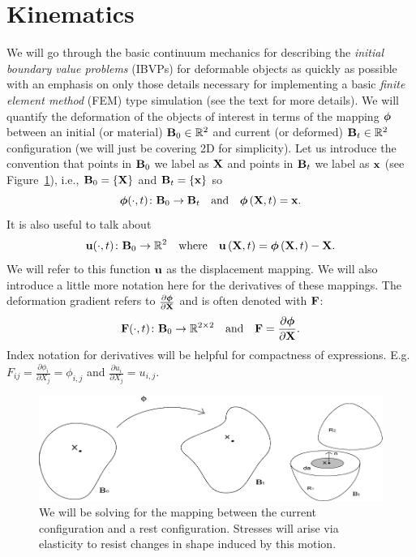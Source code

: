 
\section{Kinematics}

We will go through the basic continuum mechanics for describing the \emph{initial boundary value problems} (IBVPs) for deformable objects as quickly as possible with an emphasis on only those details necessary for implementing a basic \emph{finite element method} (FEM) type simulation (see the text \cite{Bonet_Wood_2008} for more details). We will quantify the deformation of the objects of interest in terms of the mapping $\boldsymbol{\phi}$ between an initial (or material) $\mathbf{B}_0 \in \mathbb{R}^2$ and current (or deformed) $\mathbf{B}_t \in \mathbb{R}^2$ configuration (we will just be covering 2D for simplicity). Let us introduce the convention that points in $\mathbf{B}_0$ we label as $\mathbf{X}$ and points in $\mathbf{B}_t$ we label as $\mathbf{x}$ (see Figure~\ref{fig:phi}), i.e., $\mathbf{B}_0 = \left\{ \mathbf{X} \right\}$ and $\mathbf{B}_t = \left\{ \mathbf{x} \right\}$ so
\begin{equation*}
\boldsymbol{\phi}(\cdot,t) \colon \mathbf{B}_0 \to \mathbf{B}_t \quad \text{and} \quad \boldsymbol{\phi} \left( \mathbf{X}, t \right) = \mathbf{x}.
\end{equation*}
It is also useful to talk about
\begin{equation*}
\mathbf{u}(\cdot,t) \colon \mathbf{B}_0 \to \mathbb{R}^2 \quad \text{where} \quad \mathbf{u} \left( \mathbf{X}, t \right) = \boldsymbol{\phi} \left( \mathbf{X}, t \right) - \mathbf{X}.
\end{equation*}
We will refer to this function $\mathbf{u}$ as the displacement mapping. We will also introduce a little more notation here for the derivatives of these mappings. The deformation gradient refers to $\frac{\partial\boldsymbol{\phi}}{\partial\mathbf{X}}$ and is often denoted with $\mathbf{F}$:
\begin{equation*}
\mathbf{F}(\cdot,t) \colon \mathbf{B}_0 \to \mathbb{R}^{2\times2} \quad \text{and} \quad \mathbf{F} = \frac{\partial\boldsymbol{\phi}}{\partial\mathbf{X}}.
\end{equation*}
Index notation for derivatives will be helpful for compactness of expressions. E.g. $F_{ij} = \frac{\partial\phi_i}{\partial X_j} = \phi_{i,j}$ and $\frac{\partial u_i}{\partial X_j} = u_{i,j}$.
\begin{figure}
\includegraphics[width=\columnwidth]{images/continuum}
\caption{We will be solving for the mapping between the current configuration and a rest configuration. Stresses will arise via elasticity to resist changes in shape induced by this motion.}
\label{fig:phi}
\end{figure}

